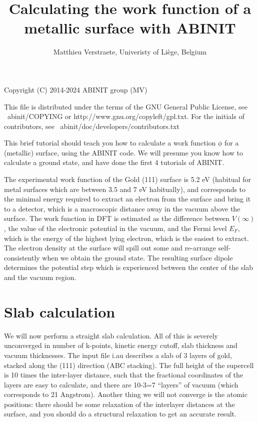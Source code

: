 \documentclass{report}
\begin{document}
\title{Calculating the work function of a metallic surface with ABINIT}

\author{Matthieu Verstraete, Univeristy of Li\`ege, Belgium}

\maketitle
Copyright (C) 2014-2024 ABINIT group (MV)

This file is distributed under the terms of the
GNU General Public License, see ~abinit/COPYING
or http://www.gnu.org/copyleft/gpl.txt.
For the initials of contributors, see ~abinit/doc/developers/contributors.txt

This brief tutorial should teach you how to calculate a work function $\phi$ for a (metallic) surface, using the ABINIT code. We will presume you know how to calculate a ground state, and have done the first 4 tutorials of ABINIT.

The experimental work function of the Gold (111) surface is 5.2 eV (habitual for metal surfaces which are between 3.5 and 7 eV habitually), and corresponds to the minimal energy required to extract an electron from the surface and bring it to a detector, which is a macroscopic distance away in the vacuum above the surface. The work function in DFT is estimated as the difference between $V(\infty)$, the value of the electronic potential in the vacuum, and the Fermi level $E_F$, which is the energy of the highest lying electron, which is the easiest to extract. The electron density at the surface will spill out some and re-arrange self-consistently when we obtain the ground state. The resulting surface dipole determines the potential step which is experienced between the center of the slab and the vacuum region.

\section{Slab calculation}
We will now perform a straight slab calculation. All of this is severely unconverged in number of k-points, kinetic energy cutoff,  slab thickness and vacuum thicknesses. The input file i.au describes a slab of 3 layers of gold, stacked along the (111) direction (ABC stacking). The full height of the supercell is 10 times the inter-layer distance, such that the fractional coordinates of the layers are easy to calculate, and there are 10-3=7 ``layers'' of vacuum (which corresponds to 21 Angstrom). Another thing we will not converge is the atomic positions: there should be some relaxation of the interlayer distances at the surface, and you should do a structural relaxation to get an accurate result.
\end{document}
